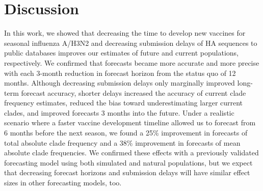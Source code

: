 \documentclass[9pt,lineno]{elife}
\begin{document}
\section{Discussion}

In this work, we showed that decreasing the time to develop new vaccines for seasonal influenza A/H3N2 and decreasing submission delays of HA sequences to public databases improves our estimates of future and current populations, respectively.
We confirmed that forecasts became more accurate and more precise with each 3-month reduction in forecast horizon from the status quo of 12 months.
Although decreasing submission delays only marginally improved long-term forecast accuracy, shorter delays increased the accuracy of current clade frequency estimates, reduced the bias toward underestimating larger current clades, and improved forecasts 3 months into the future.
Under a realistic scenario where a faster vaccine development timeline allowed us to forecast from 6 months before the next season, we found a 25\% improvement in forecasts of total absolute clade frequency and a 38\% improvement in forecasts of mean absolute clade frequencies.
We confirmed these effects with a previously validated forecasting model using both simulated and natural populations, but we expect that decreasing forecast horizons and submission delays will have similar effect sizes in other forecasting models, too.
\end{document}
